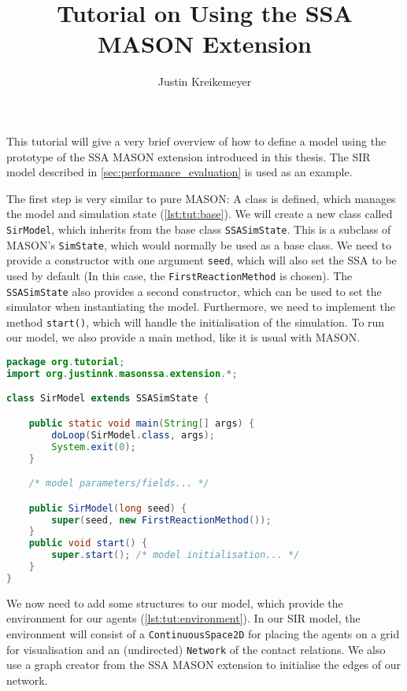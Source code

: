 \documentclass[a4paper, 12pt, bibliography=numbered]{article}
\title{Tutorial on Using the SSA MASON Extension}
\author{Justin Kreikemeyer}
\begin{document}
\maketitle

This tutorial will give a very brief overview of how to define a model using the prototype of the SSA MASON extension introduced in this thesis. The SIR model described in \autoref{sec:performance_evaluation} is used as an example.

The first step is very similar to pure MASON: A class is defined, which manages the model and simulation state (\autoref{lst:tut:base}). We will create a new class called \texttt{SirModel}, which inherits from the base class \texttt{SSASimState}. This is a subclass of MASON's \texttt{SimState}, which would normally be used as a base class. We need to provide a constructor with one argument \texttt{seed}, which will also set the SSA to be used by default (In this case, the \texttt{FirstReactionMethod} is chosen). The \texttt{SSASimState} also provides a second constructor, which can be used to set the simulator when instantiating the model. Furthermore, we need to implement the method \texttt{start()}, which will handle the initialisation of the simulation. To run our model, we also provide a main method, like it is usual with MASON.

\begin{lstlisting}[label=lst:tut:base,caption={The basis of our SIR model.},language=Java]
package org.tutorial;
import org.justinnk.masonssa.extension.*;

class SirModel extends SSASimState {

    public static void main(String[] args) {
        doLoop(SirModel.class, args);
        System.exit(0);
    }

    /* model parameters/fields... */

    public SirModel(long seed) {
        super(seed, new FirstReactionMethod());
    }
    public void start() {
        super.start(); /* model initialisation... */
    }
}
\end{lstlisting}

We now need to add some structures to our model, which provide the environment for our agents (\autoref{lst:tut:environment}). In our SIR model, the environment will consist of a \texttt{ContinuousSpace2D} for placing the agents on a grid for visualisation and an (undirected) \texttt{Network} of the contact relations. We also use a graph creator from the SSA MASON extension to initialise the edges of our network.
\end{document}
